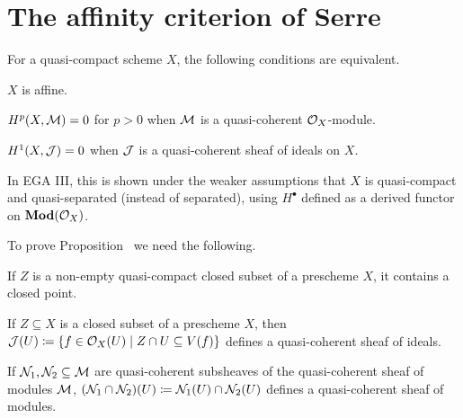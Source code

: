 \documentclass[a4paper,parskip=half,numbers=enddot, DIV=12]{scrreprt}
\begin{document}
\section{The affinity criterion of Serre}
\begin{prop}
	For a quasi-compact scheme $X$, the following conditions are equivalent.
	\begin{alphanumerate}
		\item $X$ is affine.
		\item $H^p(X,\mathcal{M})=0$ for $p>0$ when $\mathcal{M}$ is a quasi-coherent $\mathcal{O}_X$-module.
		\item $H^1(X,\mathcal{J})=0$ when $\mathcal{J}$ is a quasi-coherent sheaf of ideals on $X$.
	\end{alphanumerate}
\end{prop}
\begin{rem*}
	In EGA III, this is shown under the weaker assumptions that $X$ is quasi-compact and quasi-separated (instead of separated), using $H^\bullet $ defined as a derived functor on $\cat{Mod}(\Oo_X)$.
\end{rem*}
To prove Proposition~ we need the following.
\begin{prop}
	\begin{alphanumerate}
		\item{} If $Z$ is a non-empty quasi-compact closed subset of a prescheme $X$, it contains a closed point.
		\item{} If $Z\subseteq X$ is a closed subset of a prescheme $X$, then $\mathcal{J}(U) \coloneqq \{f \in \mathcal{O}_X(U) \mid Z\cap U \subseteq V(f)\}$
defines a quasi-coherent sheaf of ideals.
	\item{} If $\mathcal{N}_1,\mathcal{N}_2\subseteq \mathcal{M}$ are quasi-coherent subsheaves of the quasi-coherent sheaf of modules $\mathcal{M}$, $(\mathcal{N}_1 \cap \mathcal{N}_2)(U) \coloneqq \mathcal{N}_1(U)\cap
\mathcal{N}_2(U)$ defines a quasi-coherent sheaf of modules.
	\end{alphanumerate}
\end{prop}
\end{document}
